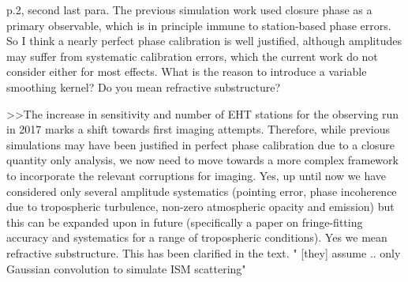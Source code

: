 p.2, second last para. The previous simulation work used closure phase as a primary observable, which is in principle immune to station-based phase errors. So I think a nearly perfect phase calibration is well justified, although amplitudes may suffer from systematic calibration errors, which the current work do not consider either for most effects. What is the reason to introduce a variable smoothing kernel? Do you mean refractive substructure?

>>The increase in sensitivity and number of EHT stations for the observing run in 2017 marks a shift towards first imaging attempts. Therefore, while previous simulations may have been justified in perfect phase calibration due to a closure quantity only analysis, we now need to move towards a more complex framework to incorporate the relevant corruptions for imaging. Yes, up until now we have considered only several amplitude systematics (pointing error, phase incoherence due to tropospheric turbulence, non-zero atmospheric opacity and emission) but this can be expanded upon in future (specifically a paper on fringe-fitting accuracy and systematics for a range of tropospheric conditions).
Yes we mean refractive substructure. This has been clarified in the text. " [they] assume .. only Gaussian convolution to simulate ISM scattering" 
